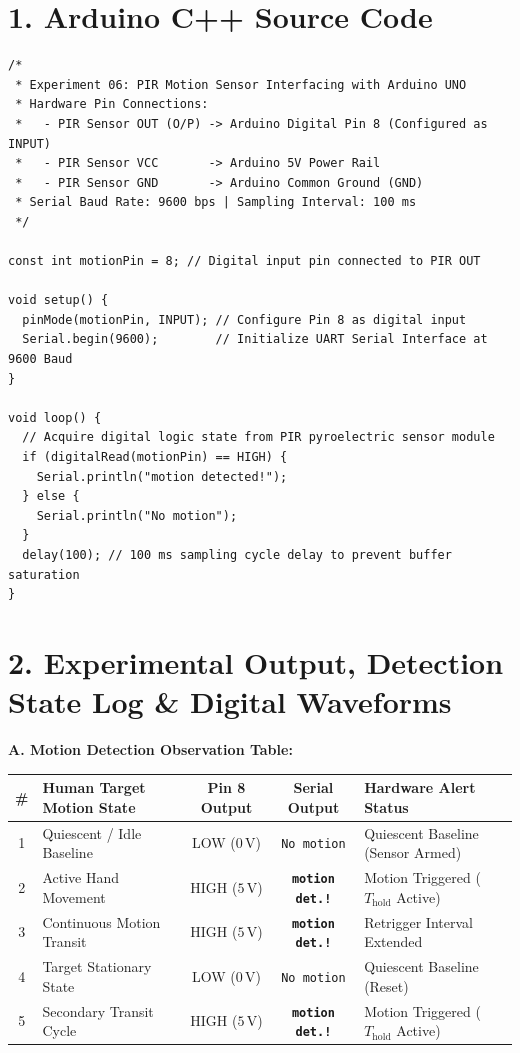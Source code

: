 \documentclass[10pt,a4paper]{article}
\begin{document}
\section*{1. Arduino C++ Source Code}
\begin{lstlisting}[style=bwCode, title={\textbf{Listing 6.1: Microcontroller Firmware for PIR Motion Sensing and Serial Event Telemetry.}}]
/*
 * Experiment 06: PIR Motion Sensor Interfacing with Arduino UNO
 * Hardware Pin Connections:
 *   - PIR Sensor OUT (O/P) -> Arduino Digital Pin 8 (Configured as INPUT)
 *   - PIR Sensor VCC       -> Arduino 5V Power Rail
 *   - PIR Sensor GND       -> Arduino Common Ground (GND)
 * Serial Baud Rate: 9600 bps | Sampling Interval: 100 ms
 */

const int motionPin = 8; // Digital input pin connected to PIR OUT

void setup() {
  pinMode(motionPin, INPUT); // Configure Pin 8 as digital input
  Serial.begin(9600);        // Initialize UART Serial Interface at 9600 Baud
}

void loop() {
  // Acquire digital logic state from PIR pyroelectric sensor module
  if (digitalRead(motionPin) == HIGH) {
    Serial.println("motion detected!");
  } else {
    Serial.println("No motion");
  }
  delay(100); // 100 ms sampling cycle delay to prevent buffer saturation
}
\end{lstlisting}

\vspace{0.06cm}
\section*{2. Experimental Output, Detection State Log \& Digital Waveforms}

\noindent
\textbf{A. Motion Detection Observation Table:}\par\vspace{0.06cm}
{\footnotesize
\setlength{\tabcolsep}{4.5pt}
\renewcommand{\arraystretch}{1.18}
\begin{tabularx}{\textwidth}{|c|p{4.6cm}|c|c|X|}
\hline
\textbf{\#} & \textbf{Human Target Motion State} & \textbf{Pin 8 Output} & \textbf{Serial Output} & \textbf{Hardware Alert Status} \\
\hline
1 & Quiescent / Idle Baseline & LOW ($0\,\text{V}$) & \texttt{No motion} & Quiescent Baseline (Sensor Armed) \\
2 & Active Hand Movement & HIGH ($5\,\text{V}$) & \textbf{\texttt{motion det.!}} & Motion Triggered ($T_{\text{hold}}$ Active) \\
3 & Continuous Motion Transit & HIGH ($5\,\text{V}$) & \textbf{\texttt{motion det.!}} & Retrigger Interval Extended \\
4 & Target Stationary State & LOW ($0\,\text{V}$) & \texttt{No motion} & Quiescent Baseline (Reset) \\
5 & Secondary Transit Cycle & HIGH ($5\,\text{V}$) & \textbf{\texttt{motion det.!}} & Motion Triggered ($T_{\text{hold}}$ Active) \\
\hline
\end{tabularx}
}
\end{document}
